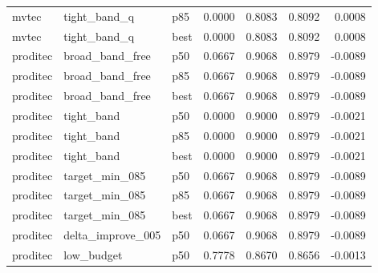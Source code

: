 \begin{tabular}{lllrrrr}
   mvtec &         tight\_band\_q &    p85 &                           0.0000 &                      0.8083 &                 0.8092 &                           0.0008 \\
   mvtec &         tight\_band\_q &   best &                           0.0000 &                      0.8083 &                 0.8092 &                           0.0008 \\
proditec &      broad\_band\_free &    p50 &                           0.0667 &                      0.9068 &                 0.8979 &                          -0.0089 \\
proditec &      broad\_band\_free &    p85 &                           0.0667 &                      0.9068 &                 0.8979 &                          -0.0089 \\
proditec &      broad\_band\_free &   best &                           0.0667 &                      0.9068 &                 0.8979 &                          -0.0089 \\
proditec &           tight\_band &    p50 &                           0.0000 &                      0.9000 &                 0.8979 &                          -0.0021 \\
proditec &           tight\_band &    p85 &                           0.0000 &                      0.9000 &                 0.8979 &                          -0.0021 \\
proditec &           tight\_band &   best &                           0.0000 &                      0.9000 &                 0.8979 &                          -0.0021 \\
proditec &       target\_min\_085 &    p50 &                           0.0667 &                      0.9068 &                 0.8979 &                          -0.0089 \\
proditec &       target\_min\_085 &    p85 &                           0.0667 &                      0.9068 &                 0.8979 &                          -0.0089 \\
proditec &       target\_min\_085 &   best &                           0.0667 &                      0.9068 &                 0.8979 &                          -0.0089 \\
proditec &    delta\_improve\_005 &    p50 &                           0.0667 &                      0.9068 &                 0.8979 &                          -0.0089 \\
proditec &           low\_budget &    p50 &                           0.7778 &                      0.8670 &                 0.8656 &                          -0.0013 \\

\end{tabular}
